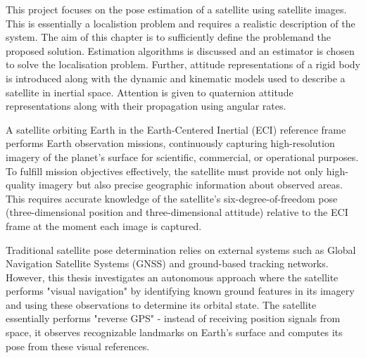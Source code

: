 \label{chap:modelling}

\label{sec:modintro}

This project focuses on the pose estimation of a satellite using satellite images. This is essentially a localistion problem
and requires a realistic description of the system. The aim of this chapter is to sufficiently define the problemand the proposed solution. Estimation
algorithms is discussed and an estimator is chosen to solve the localisation problem. Further, attitude representations of a rigid body is introduced
along with the dynamic and kinematic models used to describe a satellite in inertial space. Attention is given to quaternion attitude representations along
with their propagation using angular rates.

\label{sec:moddef}

A satellite orbiting Earth in the Earth-Centered Inertial (ECI) reference frame performs Earth observation missions, 
continuously capturing high-resolution imagery of the planet's surface for scientific, commercial, or operational purposes. 
To fulfill mission objectives effectively, the satellite must provide not only high-quality imagery but also precise geographic 
information about observed areas. This requires accurate knowledge of the satellite's six-degree-of-freedom pose 
(three-dimensional position and three-dimensional attitude) relative to the ECI frame at the moment each image is captured.
\vspace{0.5cm}

Traditional satellite pose determination relies on external systems such as Global Navigation Satellite Systems (GNSS) 
and ground-based tracking networks. However, this thesis investigates an autonomous approach where the satellite performs 
"visual navigation" by identifying known ground features in its imagery and using these observations to determine its orbital 
state. The satellite essentially performs "reverse GPS" - instead of receiving position signals from space, it observes 
recognizable landmarks on Earth's surface and computes its pose from these visual references.
\vspace{0.5cm}

